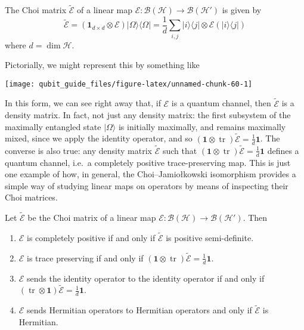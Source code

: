 \documentclass[fleqn]{article}
\providecommand{\tightlist}{%
  \setlength{\itemsep}{0pt}\setlength{\parskip}{0pt}}
\newenvironment{idea}{\noindent}{\medskip}
\begin{document}
\begin{idea}

The Choi matrix \(\widetilde{\mathcal{E}}\) of a linear map \(\mathcal{E}\colon\mathcal{B}(\mathcal{H})\to\mathcal{B}(\mathcal{H'})\) is given by
\[
  \widetilde{\mathcal{E}}
  = (\mathbf{1}_{d\times d}\otimes\mathcal{E})|\Omega\rangle\langle\Omega|
  = \frac{1}{d} \sum_{i,j} |i\rangle\langle j|\otimes\mathcal{E}(|i\rangle\langle j|)
\]
where \(d=\dim\mathcal{H}\).

Pictorially, we might represent this by something like

\begin{center}\texttt{[image: qubit\_guide\_files/figure-latex/unnamed-chunk-60-1]} \end{center}

\end{idea}

In this form, we can see right away that, if \(\mathcal{E}\) is a quantum channel, then \(\widetilde{\mathcal{E}}\) is a density matrix.
In fact, not just any density matrix: the first subsystem of the maximally entangled state \(|\Omega\rangle\) is initially maximally, and remains maximally mixed, since we apply the identity operator, and so \((\mathbf{1}\otimes\operatorname{tr})\widetilde{\mathcal{E}}=\frac{1}{d}\mathbf{1}\).
The converse is also true: any density matrix \(\widetilde{\mathcal{E}}\) such that \((\mathbf{1}\otimes\operatorname{tr})\widetilde{\mathcal{E}}=\frac{1}{d}\mathbf{1}\) defines a quantum channel, i.e.~a completely positive trace-preserving map.
This is just one example of how, in general, the Choi--Jamiołkowski isomorphism provides a simple way of studying linear maps on operators by means of inspecting their Choi matrices.

\begin{idea}

Let \(\widetilde{\mathcal{E}}\) be the Choi matrix of a linear map \(\mathcal{E}\colon\mathcal{B}(\mathcal{H})\to\mathcal{B}(\mathcal{H'})\).
Then

\begin{enumerate}
\def\labelenumi{\arabic{enumi}.}
\tightlist
\item
  \(\mathcal{E}\) is completely positive if and only if \(\widetilde{\mathcal{E}}\) is positive semi-definite.
\item
  \(\mathcal{E}\) is trace preserving if and only if \((\mathbf{1}\otimes\operatorname{tr})\widetilde{\mathcal{E}}=\frac{1}{d}\mathbf{1}\).
\item
  \(\mathcal{E}\) sends the identity operator to the identity operator if and only if \((\operatorname{tr}\otimes\mathbf{1})\widetilde{\mathcal{E}}=\frac{1}{d}\mathbf{1}\).
\item
  \(\mathcal{E}\) sends Hermitian operators to Hermitian operators and only if \(\widetilde{\mathcal{E}}\) is Hermitian.
\end{enumerate}

\end{idea}
\end{document}
